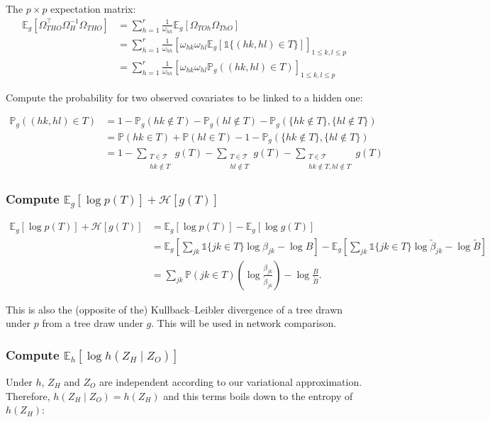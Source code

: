 \documentclass[11pt,a4paper]{article}
\newcommand{\Esp}{\mathds{E}}
\newcommand{\entr}{\mathcal{H}}
\begin{document}
The $p \times p$ expectation matrix:
\begin{align*}
\Esp_g[\Omega_{THO}^\intercal \Omega_H^{-1}\Omega_{THO}] &= \sum_{h=1}^r \frac{1}{\omega_{hh}} \Esp_g[\Omega_{TOh} \Omega_{ThO}]\\
&= \sum_{h=1}^r \frac{1}{\omega_{hh}} \left[ \omega_{hk}\omega_{hl}\Esp_g[\mathds{1}\{(hk,hl)\in T\}]\right]_{1\leq k,l\leq p}\\
&=\sum_{h=1}^r \frac{1}{\omega_{hh}} \left[ \omega_{hk}\omega_{hl}\mathds{P}_g((hk,hl)\in T)\right]_{1\leq k,l\leq p}
\end{align*}

Compute the probability for two observed covariates to be linked to a hidden one:

\begin{align*}
\mathds{P}_g((hk,hl)\in T)&= 1 - \mathds{P}_g(hk \notin T)- \mathds{P}_g(hl \notin T) - \mathds{P}_g( \{hk \notin T\}, \{hl \notin T\})\\
&= \mathds{P}(hk \in T) + \mathds{P}(hl \in T) -1 -\mathds{P}_g( \{hk \notin T\}, \{hl \notin T\})\\
&=1-\sum_{\substack{T \in \mathcal{T}\\ hk \notin T}} g(T)-\sum_{\substack{T \in \mathcal{T}\\ hl \notin T}} g(T)-\sum_{\substack{T \in \mathcal{T}\\ hk \notin T, hl \notin T}} g(T)
\end{align*}
\subsubsection{Compute $\Esp_g[\log p(T)] + \entr[g(T)]$}

\begin{align*}
\Esp_g[\log p(T)] + \entr[g(T)]&=\Esp_g[\log p(T)] -\Esp_g[\log g(T)]\\
&=\Esp_g\left[ \sum_{jk} \mathds{1}\{jk \in T\} \log \beta_{jk} - \log B\right] - \Esp_g\left[\sum_{jk} \mathds{1}\{jk \in T\} \log \widetilde{\beta}_{jk} - \log \widetilde{B}\right]\\
&= \sum_{jk}\mathds{P}(jk\in T) \left(\log \frac{\beta_{jk}}{\widetilde{\beta}_{jk}}\right) - \log \frac{B}{\widetilde{B}} 
.\end{align*}

This is also the (opposite of the) Kullback–Leibler divergence of a tree drawn under $p$ from a tree draw under $g$. This will be used in network comparison.


\subsubsection{Compute $\Esp_h[\log h(Z_H\mid Z_O)]$}
Under $h$, $Z_H$ and $Z_O$ are independent according to our variational approximation. Therefore, $h(Z_H\mid Z_O) = h(Z_H)$ and this terms boils down to the entropy of $h(Z_H)$:
\end{document}
